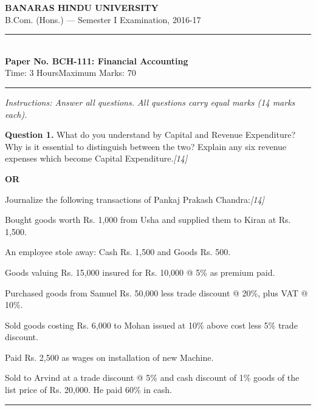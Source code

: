 \documentclass[11pt,a4paper]{article}
\newcommand{\pts}[1]{\hfill   \textit{[#1]}}
\begin{document}
\begin{center}
  {\large\bfseries BANARAS HINDU UNIVERSITY}\\[2pt]
  {\normalsize B.Com. (Hons.) --- Semester I Examination, 2016-17}\\[6pt]
  \rule{0.8\linewidth}{0.5pt}\\[6pt]
  {\large\bfseries Paper No. BCH-111: Financial Accounting}\\[4pt]
  {\normalsize Time: 3 Hours\hfill Maximum Marks: 70}
\end{center}

\rule{\linewidth}{0.4pt}

\smallskip



\noindent   \textit{Instructions: Answer all questions. All questions carry equal marks (14 marks each).}

\bigskip




\noindent   \textbf{Question 1.}
What do you understand by Capital and Revenue Expenditure? Why is it essential to distinguish between the two? Explain any six revenue expenses which become Capital Expenditure.\pts{14}

\centerline{   \textbf{OR}}

Journalize the following transactions of Pankaj Prakash Chandra:\pts{14}

\begin{parts}
  \item Bought goods worth Rs. 1,000 from Usha and supplied them to Kiran at Rs. 1,500.
  \item An employee stole away: Cash Rs. 1,500 and Goods Rs. 500.
  \item Goods valuing Rs. 15,000 insured for Rs. 10,000 @ 5\% as premium paid.
  \item Purchased goods from Samuel Rs. 50,000 less trade discount @ 20\%, plus VAT @ 10\%.
  \item Sold goods costing Rs. 6,000 to Mohan issued at 10\% above cost less 5\% trade discount.
  \item Paid Rs. 2,500 as wages on installation of new Machine.
  \item Sold to Arvind at a trade discount @ 5\% and cash discount of 1\% goods of the list price of Rs. 20,000. He paid 60\% in cash.
\end{parts}

\medskip\rule{\linewidth}{0.2pt}
\end{document}
